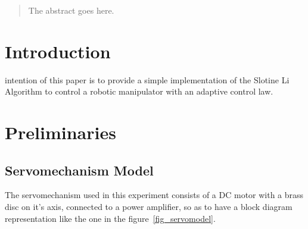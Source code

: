 \documentclass[journal]{IEEEtran}
\begin{document}
\maketitle

\begin{abstract}
The abstract goes here.
\end{abstract}

%

\section{Introduction}
% 
% 
% 
% 
 intention of this paper is to provide a simple implementation of the Slotine Li Algorithm to control a robotic manipulator with an adaptive control law.

\section{Preliminaries}

    \subsection{Servomechanism Model}

        The servomechanism used in this experiment consists of a DC motor with a brass disc on it's axis, connected to a power amplifier, so as to have a block diagram representation like the one in the figure~\ref{fig_servomodel}.
\end{document}
